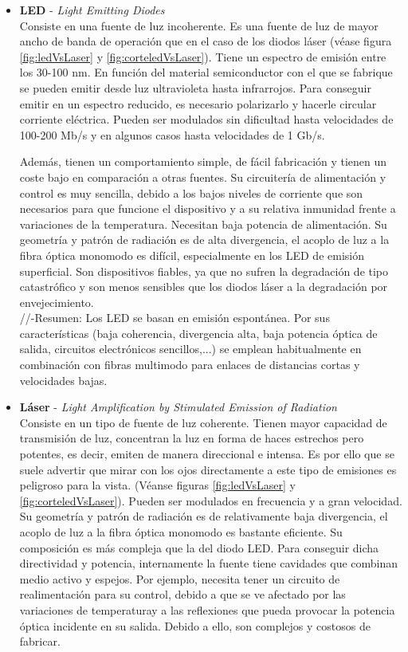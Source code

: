 \begin{itemize}
 		\begin{itemize}
 			\item \textbf{LED} - \textit{Light Emitting Diodes}\\
 			Consiste en una fuente de luz incoherente. Es una fuente de luz de mayor ancho de banda de operación que en el caso de los diodos láser (véase figura \ref{fig:ledVsLaser} y \ref{fig:corteledVsLaser}). Tiene un espectro de emisión entre los 30-100 nm. En función del material semiconductor con el que se fabrique se pueden emitir desde luz ultravioleta hasta infrarrojos. Para conseguir emitir en un espectro reducido, es necesario polarizarlo y hacerle circular corriente eléctrica. Pueden ser modulados sin dificultad hasta velocidades de 100-200 Mb/s y en algunos casos hasta velocidades de 1 Gb/s. 
 			
 			Además, tienen un comportamiento simple, de fácil fabricación y tienen un coste bajo en comparación a otras fuentes. Su circuitería de alimentación y control es muy sencilla, debido a los bajos niveles de corriente que son necesarios para que funcione el dispositivo y a su relativa inmunidad frente a variaciones de la temperatura. Necesitan baja potencia de alimentación. Su geometría y patrón de radiación es de alta divergencia, el acoplo de luz a la fibra óptica monomodo es difícil, especialmente en los LED de emisión superficial. Son dispositivos fiables, ya que no sufren la degradación de tipo catastrófico y son menos sensibles que los diodos láser a la degradación por envejecimiento. \\
 			
 					\textcolor{rositaoscuro}{//-Resumen: Los LED se basan en emisión espontánea. Por sus características (baja coherencia, divergencia alta, baja potencia óptica de salida, circuitos electrónicos sencillos,...) se emplean habitualmente en combinación con fibras multimodo para enlaces de distancias cortas y velocidades bajas.}
 			
 			\item \textbf{Láser} - \textit{Light Amplification by Stimulated Emission of Radiation}\\
 			Consiste en un tipo de fuente de luz coherente. Tienen mayor capacidad de transmisión de luz, concentran la luz en forma de haces estrechos pero potentes, es decir, emiten de manera direccional e intensa. Es por ello que se suele advertir que mirar con los ojos directamente a este tipo de emisiones es peligroso para la vista. (Véanse figuras \ref{fig:ledVsLaser} y \ref{fig:corteledVsLaser}). Pueden ser modulados en frecuencia y a gran velocidad. Su geometría y patrón de radiación es de relativamente baja divergencia, el acoplo de luz a la fibra óptica monomodo es bastante eficiente. Su composición es más compleja que la del diodo LED. Para conseguir dicha directividad y potencia, internamente la fuente tiene cavidades que combinan medio activo y espejos. Por ejemplo, necesita tener un circuito de realimentación para su control, debido a que se ve afectado por las variaciones de temperaturay a las reflexiones que pueda provocar la potencia óptica incidente en su salida. Debido a ello, son complejos y costosos de fabricar. 
 			

\end{itemize}
\end{itemize}
